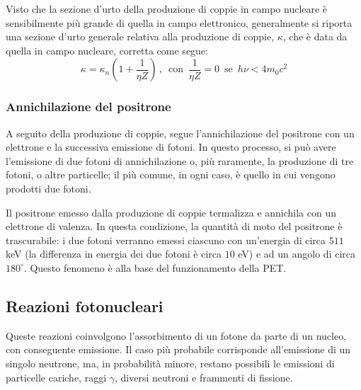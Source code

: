 \documentclass[11pt, a4paper]{scrartcl}
\theoremstyle{style}
\theoremstyle{style1}
\numberwithin{equation}{subsection}
\begin{document}
\noindent Visto che la sezione d'urto della produzione di coppie in campo nucleare \`e sensibilmente pi\`u grande di quella in campo elettronico, generalmente si riporta una sezione d'urto generale relativa alla produzione di coppie, $\kappa $, che \`e data da quella in campo nucleare, corretta come segue:
\[
\kappa  = \kappa _n \left(1 + \frac{1}{\eta Z}\right)\, , \, \text{ con } \, \frac{1}{\eta Z} = 0 \, \text{ se }\, h\nu  < 4 m_0c^2
\] 

\subsubsection{Annichilazione del positrone}

A seguito della produzione di coppie, segue l'annichilazione del positrone con un elettrone e la successiva emissione di fotoni.
In questo processo, si pu\`o avere l'emissione di due fotoni di annichilazione o, pi\`u raramente, la produzione di tre fotoni, o altre particelle; il pi\`u comune, in ogni caso, \`e quello in cui vengono prodotti due fotoni.

Il positrone emesso dalla produzione di coppie termalizza e annichila con un elettrone di valenza.
In questa condizione, la quantit\`a di moto del positrone \`e trascurabile: i due fotoni verranno emessi ciascuno con un'energia di circa $511$ keV (la differenza in energia dei due fotoni \`e circa $10$ eV) e ad un angolo di circa $180^\circ$.
Questo fenomeno \`e alla base del funzionamento della PET.

\subsection{Reazioni fotonucleari}

Queste reazioni coinvolgono l'assorbimento di un fotone da parte di un nucleo, con conseguente emissione.
Il caso pi\`u probabile corrisponde all'emissione di un singolo neutrone, ma, in probabilit\`a minore, restano possibili le emissioni di particelle cariche, raggi $\gamma$, diversi neutroni e frammenti di fissione.
\end{document}
